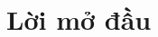 \chapter{Lời mở đầu}
\label{ch:into} %

\begin{comment}
\textbf{Guidance on introduction chapter writing:} Introductions are written in the following parts:
\begin{itemize}
    \item A brief  description of the investigated problem.
    \item A summary of the scope and context of the project, i.e., what is the background of the topic/problem/application/system/algorithm/experiment/research question/hypothesis/etc. under investigation/implementation/development [whichever is applicable to your project].
    \item The aims and objectives of the project.
    \item A description of the problem and the methodological approach adopted to solve the problem.
    \item A summary of the most significant outcomes and their interpretations.
    \item Organization of the report. 
\end{itemize}


Consult \textbf{your supervisor} to check the content of the introduction chapter. In this template, we only offer basic sections of an introduction chapter. It may  not be complete and comprehensive. Writing a report is a subjective matter, and a report's style and structure depend on the ``type of project'' as well as an individual's preference. This template suits the following project paradigms:
\begin{enumerate}
    \item software engineering and software/web application development;
    \item algorithm implementation, analysis and/or application;  
    \item science lab (experiment); and
    \item pure theoretical development (not mention extensively).
\end{enumerate}


\end{comment}
